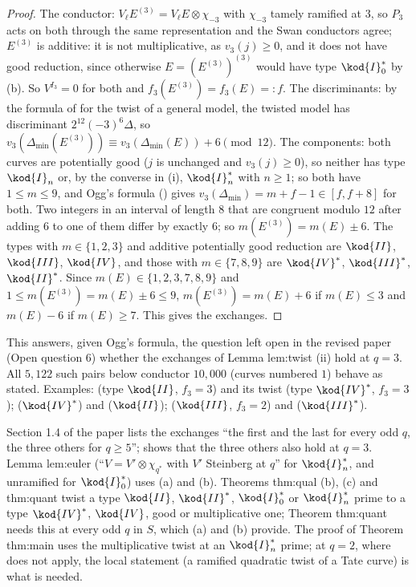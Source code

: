 \begin{proof}
The conductor: $V_\ell E^{(3)}=V_\ell E\otimes\chi_{-3}$ with $\chi_{-3}$ tamely ramified at $3$, so $P_3$ acts on both through the same
representation and the Swan conductors agree; $E^{(3)}$ is additive: it is not multiplicative, as $v_3(j)\ge0$, and it does not have good
reduction, since otherwise $E=(E^{(3)})^{(3)}$ would have type $\kod{I}_0^*$ by (b). So
$V^{I_3}=0$ for both and $f_3(E^{(3)})=f_3(E)=:f$.
The discriminants: by the formula of  for the twist of a general model, the twisted model has discriminant
$2^{12}(-3)^6\Delta$, so $v_3(\Delta_{\min}(E^{(3)}))\equiv v_3(\Delta_{\min}(E))+6\pmod{12}$.
The components: both curves are potentially good ($j$ is unchanged and $v_3(j)\ge0$), so neither has type $\kod{I}_n$ or, by the converse
in (i), $\kod{I}_n^*$ with $n\ge1$; so both have $1\le m\le9$, and Ogg's formula
() gives $v_3(\Delta_{\min})=m+f-1\in[f,f+8]$ for both. Two integers in an interval of length $8$ that are
congruent modulo $12$ after adding $6$ to one of them differ by exactly $6$; so $m(E^{(3)})=m(E)\pm6$. The types with $m\in\{1,2,3\}$ and
additive potentially good reduction are $\kod{II}$, $\kod{III}$, $\kod{IV}$, and those with $m\in\{7,8,9\}$ are $\kod{IV}^*$, $\kod{III}^*$,
$\kod{II}^*$. Since $m(E)\in\{1,2,3,7,8,9\}$ and $1\le m(E^{(3)})=m(E)\pm6\le9$, $m(E^{(3)})=m(E)+6$ if $m(E)\le3$ and $m(E)-6$ if $m(E)\ge7$. This
gives the exchanges.
\end{proof}

This answers, given Ogg's formula, the question left open in the revised paper (Open question 6) whether the exchanges of
Lemma lem:twist (ii) hold at $q=3$. All $5{,}122$ such pairs below conductor $10{,}000$ (curves numbered $1$) behave as stated. Examples:
 (type $\kod{II}$, $f_3=3$) and its twist  (type $\kod{IV}^*$, $f_3=3$);  ($\kod{IV}^*$) and 
($\kod{II}$);  ($\kod{III}$, $f_3=2$) and  ($\kod{III}^*$).

\begin{paperlink}
Section 1.4 of the paper lists the exchanges ``the first and the last for every odd $q$, the three others for $q\ge5$'';
 shows that the three others also hold at $q=3$. Lemma lem:euler (``$V=V'\otimes\chi_{q^*}$ with $V'$
Steinberg at $q$'' for $\kod{I}_n^*$, and unramified for $\kod{I}_0^*$) uses (a) and (b). Theorems thm:qual (b), (c) and thm:quant
twist a type $\kod{II}$, $\kod{II}^*$, $\kod{I}_0^*$ or $\kod{I}_n^*$ prime to a type $\kod{IV}^*$, $\kod{IV}$, good or multiplicative one; Theorem
thm:quant needs this at every odd $q$ in $S$, which (a) and (b) provide. The proof of Theorem thm:main uses the multiplicative twist at an
$\kod{I}_n^*$ prime; at $q=2$, where  does not apply, the local statement
 (a ramified quadratic twist of a Tate curve) is what is needed.
\end{paperlink}

